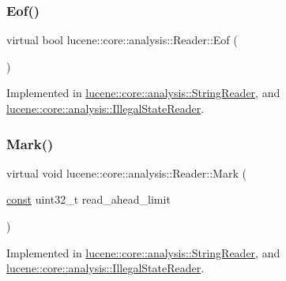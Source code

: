 \subsubsection{\texorpdfstring{Eof()}{Eof()}}
{\footnotesize\ttfamily virtual bool lucene\+::core\+::analysis\+::\+Reader\+::\+Eof (\begin{DoxyParamCaption}{ }\end{DoxyParamCaption})\hspace{0.3cm}{\ttfamily [pure virtual]}}



Implemented in \mbox{\hyperlink{classlucene_1_1core_1_1analysis_1_1StringReader_a7697e462ff19e3e8fa135e38fa3e4999}{lucene\+::core\+::analysis\+::\+String\+Reader}}, and \mbox{\hyperlink{classlucene_1_1core_1_1analysis_1_1IllegalStateReader_a0f3665a702d4b01dc3298e547379339a}{lucene\+::core\+::analysis\+::\+Illegal\+State\+Reader}}.

\mbox{\label{classlucene_1_1core_1_1analysis_1_1Reader_a0b60b07a3f65098a50f10f6618097527}} 
\subsubsection{\texorpdfstring{Mark()}{Mark()}}
{\footnotesize\ttfamily virtual void lucene\+::core\+::analysis\+::\+Reader\+::\+Mark (\begin{DoxyParamCaption}\item[{\mbox{\hyperlink{ZlibCrc32_8h_a2c212835823e3c54a8ab6d95c652660e}{const}} uint32\+\_\+t}]{read\+\_\+ahead\+\_\+limit }\end{DoxyParamCaption})\hspace{0.3cm}{\ttfamily [pure virtual]}}



Implemented in \mbox{\hyperlink{classlucene_1_1core_1_1analysis_1_1StringReader_a0ba42881881e4790dae54bc1c01063f5}{lucene\+::core\+::analysis\+::\+String\+Reader}}, and \mbox{\hyperlink{classlucene_1_1core_1_1analysis_1_1IllegalStateReader_a96a8cb65743ac1a4db9633b2e0d203fb}{lucene\+::core\+::analysis\+::\+Illegal\+State\+Reader}}.

\mbox{\label{classlucene_1_1core_1_1analysis_1_1Reader_a230fae02ca4a63de33fdaad6f9aafd96}} 
